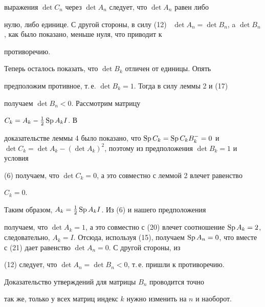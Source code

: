 \begin{pf}
выражения $\det C_n$ через $\det A_n$ следует, что $\det A_n$ равен либо 


нулю, либо единице. С другой стороны, в силу (12) \ $\det A_n=\det 


B_n$, a $\det B_n$, как было показано, меньше нуля, что приводит к 


противоречию. 


 


Теперь осталось показать, что $\det B_k$ отличен от единицы. Опять 


предположим противное, т.\,е. $\det B_k=1$. Тогда в силу леммы 2 и (17) 


получаем $\det B_n<0$. Рассмотрим матрицу\linebreak


$C_k=A_k-\frac{1}{2}\operatorname{Sp} A_k I$. В 


доказательстве леммы 4 было показано, что $\Sp C_k=\Sp C_k B^-_k=0$ и $\det 


C_k=\det A_k-(\det A_k)^2$, поэтому из предположения $\det B_k=1$ и условия 


(6) получаем, что $\det C_k=0$, а это совместно с леммой 2 влечет равенство 


$C_k=0$. 


 


Таким образом, $A_k=\frac{1}{2}\operatorname{Sp} A_k I$. Из (6) и нашего предположения 


получаем, что $\det A_k=1$, а это совместно с (20) влечет соотношение $\Sp 


A_k=2$, следовательно, $A_k=I$. Отсюда, используя (15), получаем $\Sp 


A_n=0$, что вместе с (21) дает равенство $\det A_n=0$. С другой стороны, из 


(12) следует, что $\det A_n=\det B_n<0$, т.\,е. пришли к противоречию. 


 


Доказательство утверждений для матрицы $B_n$ проводится точно 


так же, только у всех матриц индекс $k$ нужно изменить на $n$ и наоборот. 


\end{pf}


 


 


